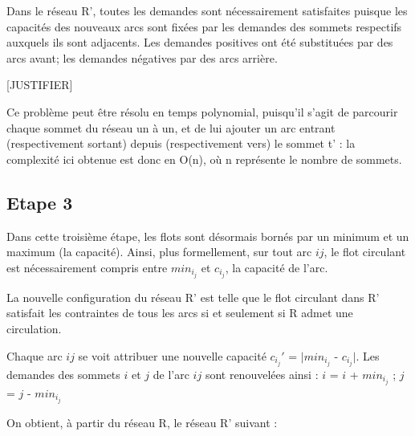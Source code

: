 \documentclass[letterpaper,12pt]{article}
\begin{document}
\hfill \break
Dans le réseau R', toutes les demandes sont nécessairement satisfaites puisque les capacités des nouveaux arcs sont fixées par les demandes des sommets respectifs auxquels ils sont adjacents. Les demandes positives ont été substituées par des arcs avant; les demandes négatives par des arcs arrière.

[JUSTIFIER]

Ce problème peut être résolu en temps polynomial, puisqu'il s'agit de parcourir chaque sommet du réseau un à un, et de lui ajouter un arc entrant (respectivement sortant) depuis (respectivement vers) le sommet t' : la complexité ici obtenue est donc en O(n), où n représente le nombre de sommets.

\subsection{Etape 3}

Dans cette troisième étape, les flots sont désormais bornés par un minimum et un maximum (la capacité). Ainsi, plus formellement, sur tout arc $ij$, le flot circulant est nécessairement compris entre $min_i_j$ et $c_i_j$, la capacité de l'arc.

La nouvelle configuration du réseau R' est telle que le flot circulant dans R' satisfait les contraintes de tous les arcs si et seulement si R admet une circulation.

Chaque arc $ij$ se voit attribuer une nouvelle capacité $c_i_j'$ = $|min_i_j$ - $c_i_j|$. Les demandes des sommets $i$ et $j$ de l'arc $ij$ sont renouvelées ainsi : 
$i$ = $i$ + $min_i_j$ ; 
$j$ = $j$ - $min_i_j$

On obtient, à partir du réseau R, le réseau R' suivant :
\end{document}
